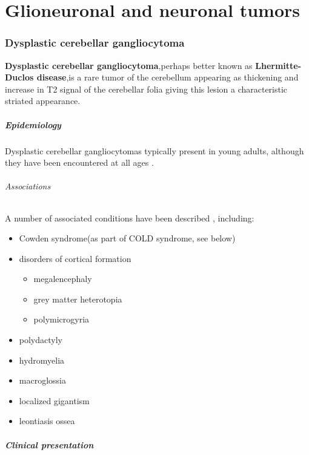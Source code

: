 \chapter{Glioneuronal and neuronal tumors}

\subsection{Dysplastic cerebellar gangliocytoma}

\textbf{Dysplastic cerebellar gangliocytoma},perhaps better known as \textbf{Lhermitte-Duclos disease},is a rare tumor of the cerebellum appearing as thickening and increase in T2 signal of the cerebellar folia giving this lesion a characteristic striated appearance.

\paragraph{Epidemiology}

Dysplastic cerebellar gangliocytomas typically present in young adults, although they have been encountered at all ages .

\subparagraph{Associations}

A number of associated conditions have been described , including:

\begin{itemize}
	\item
	Cowden syndrome(as part of COLD syndrome, see below)
	\item
	disorders of cortical formation
	
	\begin{itemize}
		\item
		megalencephaly
		\item
		grey matter heterotopia
		\item
		polymicrogyria
	\end{itemize}
	\item
	polydactyly
	\item
	hydromyelia
	\item
	macroglossia
	\item
	localized gigantism
	\item
	leontiasis ossea
\end{itemize}

\paragraph{Clinical presentation}

